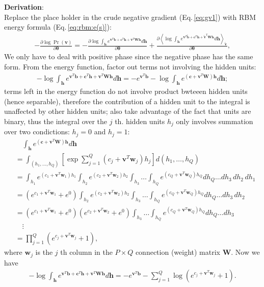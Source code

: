 \documentclass[11pt]{article}
\newcommand{\mean}[2]{\left\langle{#1}\right\rangle_{#2}}
\newcommand{\vb}{\boldsymbol{b}}
\newcommand{\vc}{\boldsymbol{c}}
\newcommand{\vh}{\boldsymbol{h}}
\newcommand{\vv}{\boldsymbol{v}}
\newcommand{\vw}{\boldsymbol{w}}
\newcommand{\mw}{\boldsymbol{W}}
\newcommand{\vbt}{\tilde{\vb}}
\newcommand{\vvt}{\tilde{\vv}}
\newcommand{\pEC}{\boldsymbol{\theta}}
\newcommand{\PDV}[2]{\frac{\partial #1}{\partial #2}}
\begin{document}
{\textbf{Derivation}: \\
Replace the place holder in the crude negative gradient (Eq.\,\ref{eq:gv1}) with RBM energy formula (Eq.\,\ref{eq:rbm:e(s)}):
\begin{align*}
  -\PDV{\log{\Pr(\vv)}}{\pEC} = -\PDV{\log{\int_{\vh}{e^{\vv^T\vb + \vc^T\vh + \vv^T\mw\vh}d\vh}}}{\pEC} + \PDV{\mean{\log{\int_{\vh}{e^{\vv^T\vbt + \vc^T\vh + \vvt^T\mw\vh}d\vh}}}{\vvt}}{\pEC},
\end{align*}
We only have to deal with positive phase since the negative phase has the same form. From the energy function, factor out terms not involving the hidden units:
\begin{align*}
  -\log{\int_{\vh}{e^{\vv^T\vb + \vc^T\vh + \vv^T\mw\vh}} d\vh} = -e^{\vv^T\vb} - \log{\int_{\vh}{e^{(\vc + \vv^T\mw)\vh}} d\vh};
\end{align*}
terms left in the energy function do not involve product bwteeen hidden units (hence separable), therefore the contribution of a hidden unit to the integral is unaffected by other hidden units; also take advantage of the fact that units are binary, thus the integral over the $j$ th. hidden units $h_j$ only involves summation over two condictions: $h_j=0$ and $h_j=1$:
\begin{align*}
  & \quad \int_{\vh}{e^{(\vc + \vv^T\mw)\vh}} d\vh \\
  & = \int_{(h_1, \dots, h_Q)} \left[\exp{\sum_{j=1}^Q{(c_j + \vv^T\vw_j)h_j}} \right] d(h_1, \dots, h_Q) \\
  & = \int_{h_1}e^{(c_1 + \vv^T\vw_1)h_1}                 \int_{h_2}e^{(c_2 + \vv^T\vw_2)h_2} \int_{h_3} \dots \int_{h_Q}e^{(c_Q + \vv^T\vw_Q)h_Q} dh_Q \dots dh_3\,dh_2\,dh_1 \\
  & = (e^{c_1+\vv^T\vw_1}+e^0)                            \int_{h_2}e^{(c_2 + \vv^T\vw_2)h_2} \int_{h_3} \dots \int_{h_Q}e^{(c_Q + \vv^T\vw_Q)h_Q} dh_Q \dots dh_3\,dh_2 \\
  & = (e^{c_1+\vv^T\vw_1}+e^0)                            (e^{c_2+\vv^T\vw_2} + e^0)          \int_{h_3} \dots \int_{h_Q}e^{(c_Q + \vv^T\vw_Q)h_Q} dh_Q \dots dh_3 \\
  & \quad \vdots \\
  & = \prod_{j=1}^Q{(e^{c_j + \vv^T\vw_j}+1)},
\end{align*}
where $\vw_j$ is the $j$ th column in the $P \times Q$ connection (weight) matrix $\mw$. Now we have
\begin{align*}
  -\log{\int_{\vh}{e^{\vv^T\vb + \vc^T\vh + \vv^T\mw\vh}} d\vh} = -e^{\vv^T\vb} - \sum_{j=1}^Q{\log{(e^{c_j + \vv^T\vw_j}+1)}}.

\end{align*}}
\end{document}
